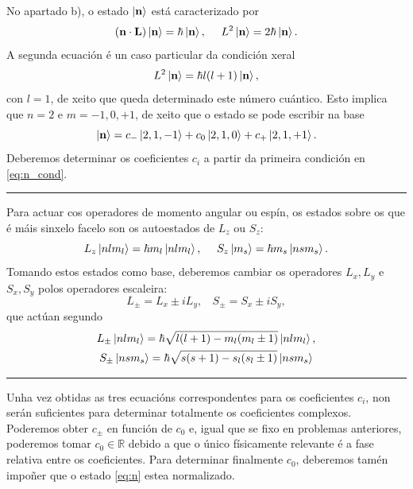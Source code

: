 \documentclass[a4paper,12pt]{article}
\begin{document}
No apartado b), o estado $\ket{\textbf{n}}$ está caracterizado por
\begin{equation}
	(\textbf{n} \cdot \textbf{L})\ket{\textbf{n}} = \hbar \ket{\textbf{n}}, ~~~~ L^2 \ket{\textbf{n}} = 2\hbar \ket{\textbf{n}}.
	\label{eq:n_cond}
\end{equation}
\noindent
A segunda ecuación é un caso particular da condición xeral
\begin{equation}
	L^2 \ket{\textbf{n}} = \hbar l(l+1) \ket{\textbf{n}},
\end{equation}
\noindent
con $l=1$, de xeito que queda determinado este número cuántico. Esto implica que $n=2$ e $m=-1,0,+1$, de xeito que o estado se pode escribir na base
\begin{equation}
	\ket{\textbf{n}} = c_- \ket{2,1,-1} + c_0 \ket{2,1,0} + c_+ \ket{2,1,+1}.
	\label{eq:n}
\end{equation}
\noindent
Deberemos determinar os coeficientes $c_i$ a partir da primeira condición en \eqref{eq:n_cond}.

\begin{center} \hrule \end{center}

Para actuar cos operadores de momento angular ou espín, os estados sobre os que é máis sinxelo facelo son os autoestados de $L_z$ ou $S_z$:
\begin{equation}
	L_z \ket{nlm_l} = \hbar m_l \ket{nlm_l}, ~~~~ S_z \ket{m_s} = \hbar m_s \ket{nsm_s}.
\end{equation}
\noindent
Tomando estos estados como base, deberemos cambiar os operadores $L_x,L_y$ e $S_x,S_y$ polos operadores escaleira:
\begin{equation}
	L_\pm = L_x \pm i L_y, ~~~~ S_\pm = S_x \pm i S_y,
\end{equation}
\noindent
que actúan segundo
\begin{equation}
\begin{gathered}
	L_\pm \ket{nlm_l} = \hbar \sqrt{l(l+1) - m_l(m_l \pm 1)} \ket{nlm_l}, \\
	S_\pm \ket{nsm_s} = \hbar \sqrt{s(s+1) - s_l(s_l \pm 1)} \ket{nsm_s}
\end{gathered}
\end{equation}

\begin{center} \hrule \end{center}

Unha vez obtidas as tres ecuacións correspondentes para os coeficientes $c_i$, non serán suficientes para determinar totalmente os coeficientes complexos. Poderemos obter $c_\pm$ en función de $c_0$ e, igual que se fixo en problemas anteriores, poderemos tomar $c_0 \in \mathbb{R}$ debido a que o único físicamente relevante é a fase relativa entre os coeficientes. Para determinar finalmente $c_0$, deberemos tamén impoñer que o estado \eqref{eq:n} estea normalizado.
\end{document}
